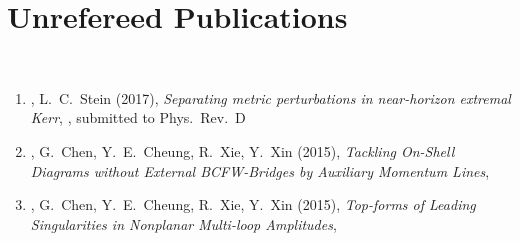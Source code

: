 \section*{\sc Unrefereed Publications}~
\vspace{-.2in}

\begin{enumerate}
  \item
  \baoyi,
  L.~C.~Stein
  (2017),
  {\it Separating metric perturbations in near-horizon extremal Kerr},
  , submitted to Phys.~Rev.~D

  \item 
  \baoyi,
  G.~Chen,
  Y.~E.~Cheung,           
  R.~Xie,
  Y.~Xin
  (2015),
  {\it Tackling On-Shell Diagrams without External BCFW-Bridges by Auxiliary Momentum Lines},
 
  \item 
  \baoyi,
  G.~Chen,
  Y.~E.~Cheung,           
  R.~Xie,
  Y.~Xin
  (2015),
  {\it Top-forms of Leading Singularities in Nonplanar Multi-loop Amplitudes},








 \end{enumerate}

